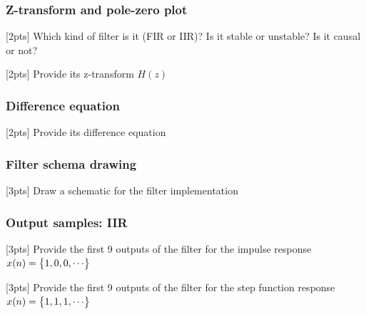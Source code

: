     \subsubsection{Z-transform and pole-zero plot}
    [2pts] Which kind of filter is it (FIR or IIR)? Is it stable or unstable? Is it causal or not?

    [2pts] Provide its z-transform $H(z)$


    \subsubsection{Difference equation}
    [2pts] Provide its difference equation


    \subsubsection{Filter schema drawing}
    [3pts] Draw a schematic for the filter implementation


    \subsubsection{Output samples: IIR}
    [3pts] Provide the first 9 outputs of the filter for the impulse response $x(n)=\begin{Bmatrix} {1,0,0,\cdots} \end{Bmatrix}$

    [3pts] Provide the first 9 outputs of the filter for the step function response $x(n)=\begin{Bmatrix} {1,1,1,\cdots} \end{Bmatrix}$

